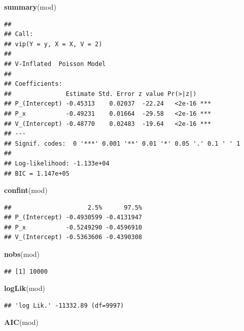 \documentclass[]{article}
\newenvironment{Shaded}{\begin{snugshade}}{\end{snugshade}}
\newcommand{\KeywordTok}[1]{\textcolor[rgb]{0.13,0.29,0.53}{\textbf{#1}}}
\newcommand{\NormalTok}[1]{#1}
\begin{document}
\begin{Shaded}
\begin{Highlighting}[]
\KeywordTok{summary}\NormalTok{(mod)}
\end{Highlighting}
\end{Shaded}

\begin{verbatim}
## 
## Call:
## vip(Y = y, X = X, V = 2)
## 
## V-Inflated  Poisson Model
## 
## Coefficients:
##               Estimate Std. Error z value Pr(>|z|)    
## P_(Intercept) -0.45313    0.02037  -22.24   <2e-16 ***
## P_x           -0.49231    0.01664  -29.58   <2e-16 ***
## V_(Intercept) -0.48770    0.02483  -19.64   <2e-16 ***
## ---
## Signif. codes:  0 '***' 0.001 '**' 0.01 '*' 0.05 '.' 0.1 ' ' 1 
## 
## Log-likelihood: -1.133e+04 
## BIC = 1.147e+05
\end{verbatim}

\begin{Shaded}
\begin{Highlighting}[]
\KeywordTok{confint}\NormalTok{(mod)}
\end{Highlighting}
\end{Shaded}

\begin{verbatim}
##                     2.5%      97.5%
## P_(Intercept) -0.4930599 -0.4131947
## P_x           -0.5249290 -0.4596910
## V_(Intercept) -0.5363606 -0.4390308
\end{verbatim}

\begin{Shaded}
\begin{Highlighting}[]
\KeywordTok{nobs}\NormalTok{(mod)}
\end{Highlighting}
\end{Shaded}

\begin{verbatim}
## [1] 10000
\end{verbatim}

\begin{Shaded}
\begin{Highlighting}[]
\KeywordTok{logLik}\NormalTok{(mod)}
\end{Highlighting}
\end{Shaded}

\begin{verbatim}
## 'log Lik.' -11332.89 (df=9997)
\end{verbatim}

\begin{Shaded}
\begin{Highlighting}[]
\KeywordTok{AIC}\NormalTok{(mod)}
\end{Highlighting}
\end{Shaded}
\end{document}
